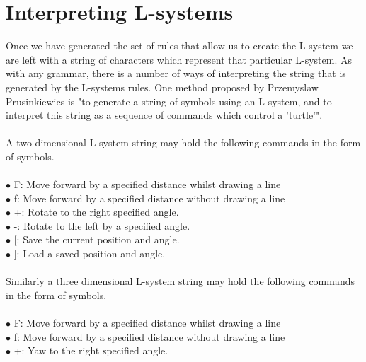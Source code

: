 \section{Interpreting L-systems}

Once we have generated the set of rules that allow us to create the L-system we are left with a string of characters which represent that particular L-system. As with any grammar, there is a number of ways of interpreting the string that is generated by the L-systems rules. One method proposed by Przemyslaw Prusinkiewics is "to generate a string of symbols using an L-system, and to interpret this string as a sequence of commands which control a 'turtle'". \cite{prusinkiewicz1986graphical}
\\
\\
A two dimensional L-system string may hold the following commands in the form of symbols. \\
\\
$\bullet$ F: 				\hspace{10mm} 		Move forward by a specified distance whilst drawing a line \\
$\bullet$ f: 				\hspace{10mm} 		Move forward by a specified distance without drawing a line \\
$\bullet$ +: 				\hspace{10mm} 		Rotate to the right specified angle. \\
$\bullet$ -: 				\hspace{10mm} 		Rotate to the left by a specified angle.  \\
$\bullet$ $[$: 				\hspace{10mm} 		Save the current position and angle. \\
$\bullet$ $]$: 				\hspace{10mm} 		Load a saved position and angle. \\
\\
Similarly a three dimensional L-system string may hold the following commands in the form of symbols. \\
\\ 
$\bullet$ F: 				\hspace{10mm}  		Move forward by a specified distance whilst drawing a line \\
$\bullet$ f: 				\hspace{10mm} 		Move forward by a specified distance without drawing a line \\
$\bullet$ +: 				\hspace{10mm} 		Yaw to the right specified angle. \\
